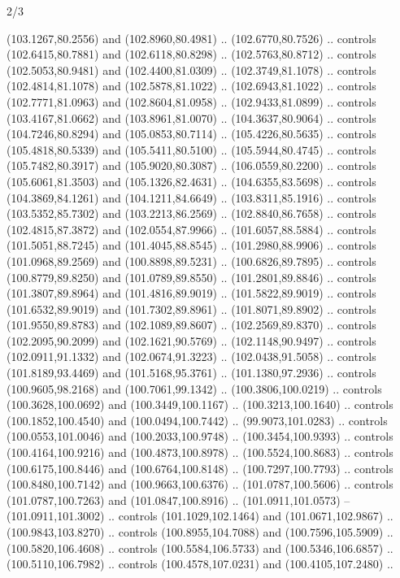 \begin{flagdescription}{2/3}
\begin{scope}[shift={(0.5\flaglength,0.5)},scale=\flagwidth/320]
\begin{scope}[y=0.8pt, x=0.8pt, yscale=-1,shift={(-118.3,-146)}]
  (103.1267,80.2556) and (102.8960,80.4981) .. (102.6770,80.7526) .. controls
  (102.6415,80.7881) and (102.6118,80.8298) .. (102.5763,80.8712) .. controls
  (102.5053,80.9481) and (102.4400,81.0309) .. (102.3749,81.1078) .. controls
  (102.4814,81.1078) and (102.5878,81.1022) .. (102.6943,81.1022) .. controls
  (102.7771,81.0963) and (102.8604,81.0958) .. (102.9433,81.0899) .. controls
  (103.4167,81.0662) and (103.8961,81.0070) .. (104.3637,80.9064) .. controls
  (104.7246,80.8294) and (105.0853,80.7114) .. (105.4226,80.5635) .. controls
  (105.4818,80.5339) and (105.5411,80.5100) .. (105.5944,80.4745) .. controls
  (105.7482,80.3917) and (105.9020,80.3087) .. (106.0559,80.2200) .. controls
  (105.6061,81.3503) and (105.1326,82.4631) .. (104.6355,83.5698) .. controls
  (104.3869,84.1261) and (104.1211,84.6649) .. (103.8311,85.1916) .. controls
  (103.5352,85.7302) and (103.2213,86.2569) .. (102.8840,86.7658) .. controls
  (102.4815,87.3872) and (102.0554,87.9966) .. (101.6057,88.5884) .. controls
  (101.5051,88.7245) and (101.4045,88.8545) .. (101.2980,88.9906) .. controls
  (101.0968,89.2569) and (100.8898,89.5231) .. (100.6826,89.7895) .. controls
  (100.8779,89.8250) and (101.0789,89.8550) .. (101.2801,89.8846) .. controls
  (101.3807,89.8964) and (101.4816,89.9019) .. (101.5822,89.9019) .. controls
  (101.6532,89.9019) and (101.7302,89.8961) .. (101.8071,89.8902) .. controls
  (101.9550,89.8783) and (102.1089,89.8607) .. (102.2569,89.8370) .. controls
  (102.2095,90.2099) and (102.1621,90.5769) .. (102.1148,90.9497) .. controls
  (102.0911,91.1332) and (102.0674,91.3223) .. (102.0438,91.5058) .. controls
  (101.8189,93.4469) and (101.5168,95.3761) .. (101.1380,97.2936) .. controls
  (100.9605,98.2168) and (100.7061,99.1342) .. (100.3806,100.0219) .. controls
  (100.3628,100.0692) and (100.3449,100.1167) .. (100.3213,100.1640) .. controls
  (100.1852,100.4540) and (100.0494,100.7442) .. (99.9073,101.0283) .. controls
  (100.0553,101.0046) and (100.2033,100.9748) .. (100.3454,100.9393) .. controls
  (100.4164,100.9216) and (100.4873,100.8978) .. (100.5524,100.8683) .. controls
  (100.6175,100.8446) and (100.6764,100.8148) .. (100.7297,100.7793) .. controls
  (100.8480,100.7142) and (100.9663,100.6376) .. (101.0787,100.5606) .. controls
  (101.0787,100.7263) and (101.0847,100.8916) .. (101.0911,101.0573) --
  (101.0911,101.3002) .. controls (101.1029,102.1464) and (101.0671,102.9867) ..
  (100.9843,103.8270) .. controls (100.8955,104.7088) and (100.7596,105.5909) ..
  (100.5820,106.4608) .. controls (100.5584,106.5733) and (100.5346,106.6857) ..
  (100.5110,106.7982) .. controls (100.4578,107.0231) and (100.4105,107.2480) ..

\end{scope}
\end{scope}
\end{flagdescription}
